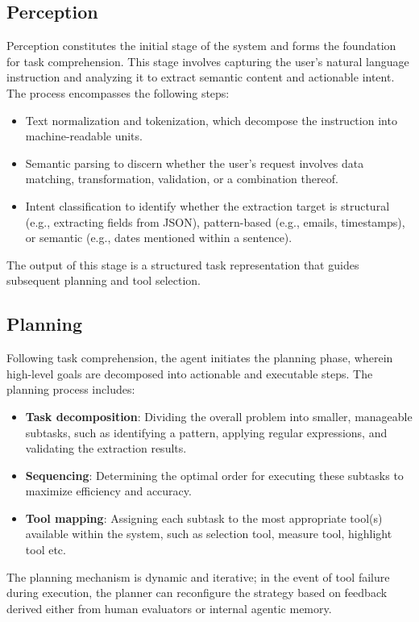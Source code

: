 \subsection{Perception}
Perception constitutes the initial stage of the system and forms the foundation for task comprehension. This stage involves capturing the user's natural language instruction and analyzing it to extract semantic content and actionable intent. The process encompasses the following steps:
\begin{itemize}
    \item Text normalization and tokenization, which decompose the instruction into machine-readable units.
    \item Semantic parsing to discern whether the user’s request involves data matching, transformation, validation, or a combination thereof.
    \item Intent classification to identify whether the extraction target is structural (e.g., extracting fields from JSON), pattern-based (e.g., emails, timestamps), or semantic (e.g., dates mentioned within a sentence).
\end{itemize}
The output of this stage is a structured task representation that guides subsequent planning and tool selection.


\subsection{Planning}
Following task comprehension, the agent initiates the planning phase, wherein high-level goals are decomposed into actionable and executable steps. The planning process includes:

\begin{itemize}
    \item \textbf{Task decomposition}: Dividing the overall problem into smaller, manageable subtasks, such as identifying a pattern, applying regular expressions, and validating the extraction results.
    \item \textbf{Sequencing}: Determining the optimal order for executing these subtasks to maximize efficiency and accuracy.
    \item \textbf{Tool mapping}: Assigning each subtask to the most appropriate tool(s) available within the system, such as selection tool, measure tool, highlight tool etc.
\end{itemize}

The planning mechanism is dynamic and iterative; in the event of tool failure during execution, the planner can reconfigure the strategy based on feedback derived either from human evaluators or internal agentic memory.



